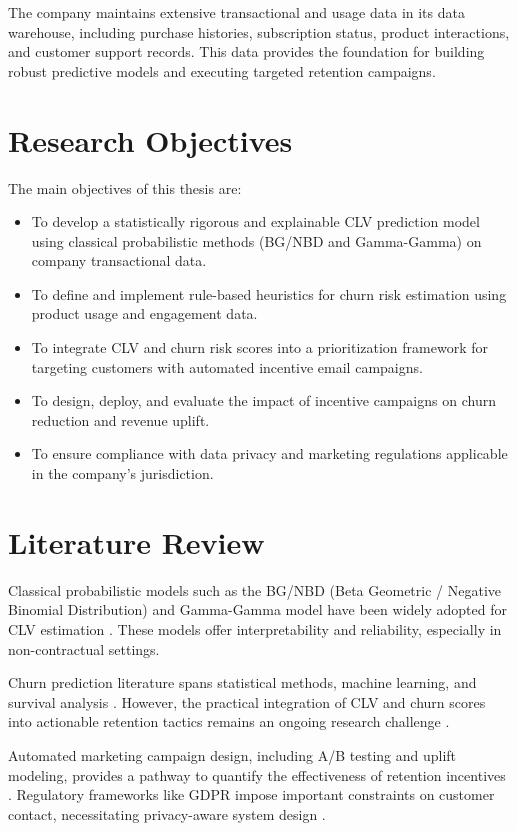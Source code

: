 \documentclass[12pt,a4paper]{article}
\begin{document}
The company maintains extensive transactional and usage data in its data warehouse, including purchase histories, subscription status, product interactions, and customer support records. This data provides the foundation for building robust predictive models and executing targeted retention campaigns.

\section{Research Objectives}
The main objectives of this thesis are:
\begin{itemize}
    \item To develop a statistically rigorous and explainable CLV prediction model using classical probabilistic methods (BG/NBD and Gamma-Gamma) on company transactional data.
    \item To define and implement rule-based heuristics for churn risk estimation using product usage and engagement data.
    \item To integrate CLV and churn risk scores into a prioritization framework for targeting customers with automated incentive email campaigns.
    \item To design, deploy, and evaluate the impact of incentive campaigns on churn reduction and revenue uplift.
    \item To ensure compliance with data privacy and marketing regulations applicable in the company’s jurisdiction.
\end{itemize}

\section{Literature Review}
Classical probabilistic models such as the BG/NBD (Beta Geometric / Negative Binomial Distribution) and Gamma-Gamma model have been widely adopted for CLV estimation \cite{fader2005counting,fader2007modeling}. These models offer interpretability and reliability, especially in non-contractual settings.

Churn prediction literature spans statistical methods, machine learning, and survival analysis \cite{verbeke2012predictive, verbeke2011new}. However, the practical integration of CLV and churn scores into actionable retention tactics remains an ongoing research challenge \cite{neslin2006defection}.

Automated marketing campaign design, including A/B testing and uplift modeling, provides a pathway to quantify the effectiveness of retention incentives \cite{radcliffe2007using}. Regulatory frameworks like GDPR impose important constraints on customer contact, necessitating privacy-aware system design \cite{voigt2017eu}.
\end{document}
